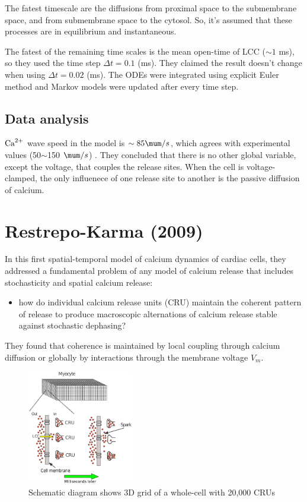 The fatest timescale are the diffusions from proximal space to the submembrane
space, and from submembrane space to the cytosol. So, it's assumed that these
processes are in equilibrium and instantaneous.

The fatest of the remaining time scales is the mean open-time of LCC ($\sim 1$
ms), so they used the time step $\Delta t = 0.1$ (ms). They claimed the result
doesn't change when using $\Delta t = 0.02$ (ms). The ODEs were integrated using
explicit Euler method and Markov models were updated after every time step. 


\subsection{Data analysis}

${\text{Ca}^{2+}}$ wave speed in the model is $\sim 85 \mum/s$, which agrees with
experimental values (50$\sim$150 $\mum/s$) \citep{wier1991,williams1992}. 
They concluded that there is no other global variable, except the voltage,
that couples the release sites. When the cell is voltage-clamped, the only
influenece of one release site to another is the passive diffusion of calcium. 

\section{Restrepo-Karma (2009)}
\label{sec:restrepo-karma-2009}


In this first spatial-temporal model of calcium dynamics of cardiac
cells, they addressed a fundamental problem of any model of calcium
release that includes stochasticity and spatial calcium release: 
\begin{itemize}
\item how do individual calcium release units (CRU) maintain the
  coherent pattern of release to produce macroscopic alternations of
  calcium release stable against stochastic dephasing? 
\end{itemize}
They found that coherence is maintained by local coupling through
calcium diffusion or globally by interactions through the membrane
voltage $V_m$. 

\begin{figure}[hbt]
  \centerline{\includegraphics[height=5cm,
    angle=0]{./images/cell_CRU.eps}}
  \caption{Schematic diagram shows 3D grid of a whole-cell with 20,000
    CRUs~\citep{restrepo2009cmc}}
\label{fig:cell_CRU}
\end{figure}

